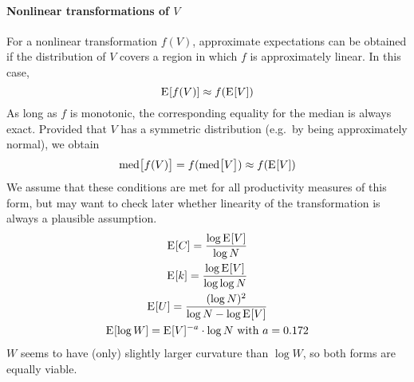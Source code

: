 \documentclass[a4paper]{article}
\begin{document}
\paragraph*{Nonlinear transformations of $V$}
For a nonlinear transformation $f(V)$, approximate expectations can be obtained
if the distribution of $V$ covers a region in which $f$ is approximately linear.
In this case,
\begin{equation}
  \label{eq:prod:exp-nonlinear}
  \mathrm{E}_{}[f(V)] \approx f(\mathrm{E}_{}[V])
\end{equation}
As long as $f$ is monotonic, the corresponding equality for the median is
always exact. Provided that $V$ has a symmetric distribution (e.g.\ by being
approximately normal), we obtain
\begin{equation}
  \label{eq:prod:median-nonlinear}
  \text{med}\bigl[ f(V) \bigr] = f( \text{med}\bigl[ V \bigr] )
  \approx f( \mathrm{E}_{}[V] )
\end{equation}
We assume that these conditions are met for all productivity measures of this
form, but may want to check later whether linearity of the transformation is
always a plausible assumption.
\begin{gather}
  \mathrm{E}_{}[C] = \frac{\log \mathrm{E}_{}[V]}{\log N}\\
  \mathrm{E}_{}[k] = \frac{\log \mathrm{E}_{}[V]}{\log \log N}\\
  \mathrm{E}_{}[U] = \frac{(\log N)^2}{\log N - \log \mathrm{E}_{}[V]}\\
  \mathrm{E}_{}[\log W] = \mathrm{E}_{}[V]^{-a}\cdot \log N \text{ with } a = 0.172
\end{gather}
$W$ seems to have (only) slightly larger curvature than $\log W$, so both
forms are equally viable.
\end{document}
